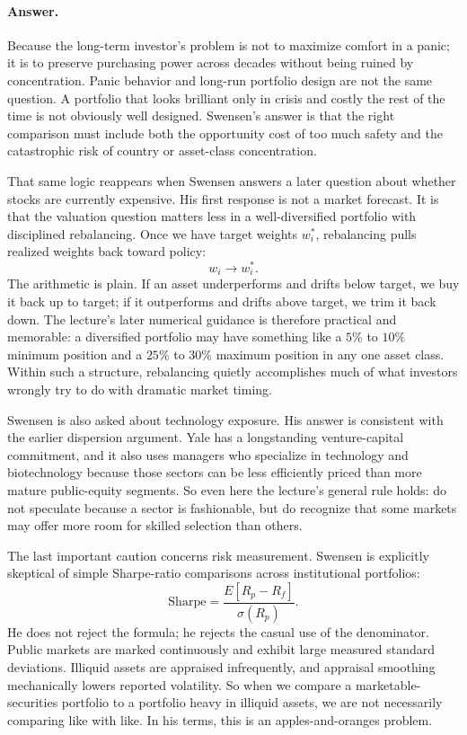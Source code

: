 \paragraph{Answer.} Because the long-term investor's problem is not to maximize comfort in a panic; it is to preserve purchasing power across decades without being ruined by concentration. Panic behavior and long-run portfolio design are not the same question. A portfolio that looks brilliant only in crisis and costly the rest of the time is not obviously well designed. Swensen's answer is that the right comparison must include both the opportunity cost of too much safety and the catastrophic risk of country or asset-class concentration.

That same logic reappears when Swensen answers a later question about whether stocks are currently expensive. His first response is not a market forecast. It is that the valuation question matters less in a well-diversified portfolio with disciplined rebalancing. Once we have target weights \(w_i^{*}\), rebalancing pulls realized weights back toward policy:
\begin{equation}
w_i \to w_i^{*}.
\end{equation}
The arithmetic is plain. If an asset underperforms and drifts below target, we buy it back up to target; if it outperforms and drifts above target, we trim it back down. The lecture's later numerical guidance is therefore practical and memorable: a diversified portfolio may have something like a \(5\%\) to \(10\%\) minimum position and a \(25\%\) to \(30\%\) maximum position in any one asset class. Within such a structure, rebalancing quietly accomplishes much of what investors wrongly try to do with dramatic market timing.

Swensen is also asked about technology exposure. His answer is consistent with the earlier dispersion argument. Yale has a longstanding venture-capital commitment, and it also uses managers who specialize in technology and biotechnology because those sectors can be less efficiently priced than more mature public-equity segments. So even here the lecture's general rule holds: do not speculate because a sector is fashionable, but do recognize that some markets may offer more room for skilled selection than others.

The last important caution concerns risk measurement. Swensen is explicitly skeptical of simple Sharpe-ratio comparisons across institutional portfolios:
\begin{equation}
\text{Sharpe}=\frac{E[R_p-R_f]}{\sigma(R_p)}.
\end{equation}
He does not reject the formula; he rejects the casual use of the denominator. Public markets are marked continuously and exhibit large measured standard deviations. Illiquid assets are appraised infrequently, and appraisal smoothing mechanically lowers reported volatility. So when we compare a marketable-securities portfolio to a portfolio heavy in illiquid assets, we are not necessarily comparing like with like. In his terms, this is an apples-and-oranges problem.

